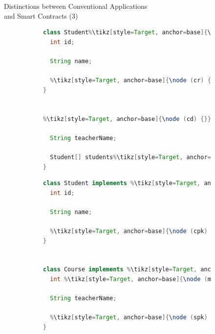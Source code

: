 \documentclass[xcolor=svgnames]{beamer}
\begin{document}
\begin{frame}[fragile]{Distinctions between Conventional Applications\\ and Smart Contracts (3)}

\begin{figure}
\centering
\hfill
\begin{subfigure}[T]{0.4\textwidth}
\begin{lstlisting}[language=java,basicstyle=\tiny, escapechar=\%,]
class Student%\tikz[style=Target, anchor=base]{\node (sd) {}}% {
  int id;

  String name;

  %\tikz[style=Target, anchor=base]{\node (cr) {}}%Course[] courses;
}


%\tikz[style=Target, anchor=base]{\node (cd) {}}%class Course {

  String teacherName;

  Student[] students%\tikz[style=Target, anchor=base]{\node (sr) {}}%;
}
\end{lstlisting}
\end{subfigure}
\hfill
\begin{subfigure}[T]{0.4\textwidth}
\begin{lstlisting}[language=java,basicstyle=\tiny, escapechar=\%,]
class Student implements %\tikz[style=Target, anchor=base]{\node (serializable1) {Serializable}}% {
  int id;

  String name;

  %\tikz[style=Target, anchor=base]{\node (cpk) {}}%int[] coursesPKs;
}


class Course implements %\tikz[style=Target, anchor=base]{\node (serializable2) {Serializable}}% {
  int %\tikz[style=Target, anchor=base]{\node (missing) {id}}%;

  String teacherName;

  %\tikz[style=Target, anchor=base]{\node (spk) {}}%int[] studentsPKs;
}
\end{lstlisting}
\end{subfigure}
\hfill
\end{figure}


\end{frame}
\end{document}
